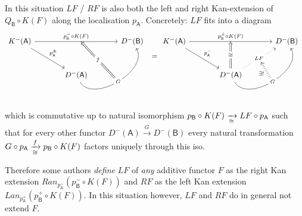 \documentclass[fontsize=11pt,fleqn,a4paper]{scrartcl}
\begin{document}
\begin{remark}
In this situation $LF$ / $RF$ is also both the left and right Kan-extension of $Q_\mathsf{B}\circ K(F)$ along the localisation $p_\mathsf{A}$. Concretely: $LF$ fits into a diagram
\[\begin{tikzcd}[sep = large]
K^-(\mathsf{A}) \ar[rr,"p_\mathsf{B}^-\circ K(F)"{name=top_arrow}] \ar[dr,"p_\mathsf{A}^\pm"] && D^-(\mathsf{B}) \\
 & D^-(\mathsf{A}) \ar[ur,bend right=90,"G"{name=G, description}]
\arrow[to=top_arrow,from=G, Rightarrow,"f" description]
\end{tikzcd}
=
\begin{tikzcd}[sep = large]
K^-(\mathsf{A}) \ar[rr,"p_\mathsf{B}^\pm\circ K(F)"{name=top_arrow}] \ar[dr,"p_\mathsf{A}^-"] && D^-(\mathsf{B}) \\
 & D^-(\mathsf{A}) \ar[ur,dotted,"LF"{name=LF, description}] \ar[ur,bend right=90,"G"{name=G,description}] \ar[to=top_arrow,Rightarrow,"\isomorphic" description]
\arrow[Rightarrow,dotted, to=LF, from=G,"\exists!"]
\end{tikzcd}\]
which is commutative up to natural isomorphism $p_\mathsf{B} \circ K(F) \xrightarrow[\cong]{} LF \circ p_\mathsf{A}$ such that for every other functor $D^-(\mathsf{A}) \xrightarrow{G} D^-(\mathsf{B})$ every natural transformation $G \circ p_\mathsf{A} \xrightarrow[\cong]{f} p_\mathsf{B} \circ K(F)$ factors uniquely through this iso.

Therefore some authors \emph{define} $LF$ of \emph{any} additive functor $F$ as the right Kan extension $Ran_{p_\mathsf{A}^-}( p_\mathsf{B}^- \circ K(F))$ and $RF$ as the left Kan extension $Lan_{p_\mathsf{A}^+}(p_\mathsf{B}^+\circ K(F))$. In this situation however, $LF$ and $RF$ do in general not extend $F$.
\end{remark}
\end{document}
